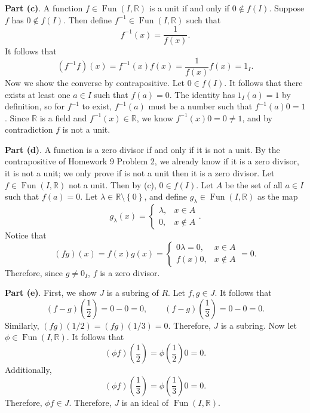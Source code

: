 \documentclass[11pt, letterpaper]{report}
\begin{document}
\noindent \textbf{Part (c)}. A function $f\in \operatorname{Fun}(I,\mathbb{R}) $ is a unit if and only if $0\notin f(I)$. Suppose $f$ has $0\notin f(I)$. Then define $f^{-1}\in \operatorname{Fun}(I,\mathbb{R}) $ such that
\[
	f^{-1}(x)=\frac{1}{f(x)}
.\]
It follows that
\[
	\left( f^{-1}f \right) (x)=f^{-1}(x)f(x)=\frac{1}{f(x)}f(x)=1_I
.\]
Now we show the converse by contrapositive. Let $0\in f(I)$. It follows that there exists at least one $a\in I$ such that $f(a)=0$. The identity  has $1_I(a)=1$ by definition, so for $f^{-1}$ to exist, $f^{-1}(a)$ must be a number such that $f^{-1}(a)0=1$. Since $\mathbb{R}$ is a field and $f^{-1}\left( x \right) \in\mathbb{R}$, we know $f^{-1}(x)0=0\neq 1$, and by contradiction $f$ is not a unit.

\noindent \textbf{Part (d)}. A function is a zero divisor if and only if it is not a unit. By the contrapositive of Homework 9 Problem 2, we already know if it is a zero divisor, it is not a unit; we only prove if is not a unit then it is a zero divisor. Let $f\in \operatorname{Fun}(I,\mathbb{R}) $ not a unit. Then by (c), $0\in f(I)$. Let $A$ be the set of all $a\in I$ such that $f(a)=0$. Let $\lambda \in\mathbb{R}\setminus\left\{ 0 \right\} $, and define $g_{\lambda }\in \operatorname{Fun}(I,\mathbb{R}) $ as the map
\[
	g_{\lambda }(x)=
	\begin{cases}
		\lambda ,&x\in A\\
		0,&x\notin A
	\end{cases}
.\]
Notice that
\[
	(fg)(x)=f(x)g(x)=
	\begin{cases}
		0\lambda=0 ,&x\in A\\
		f(x)0,&x\notin A
	\end{cases}=0
.\]
Therefore, since $g\neq 0_I$, $f$ is a zero divisor.

\noindent \textbf{Part (e)}. First, we show $J$ is a subring of $R$. Let $f,g\in J$. It follows that
\[
	(f-g)\left( \frac{1}{2} \right) =0-0=0,\qquad \left( f-g \right) \left( \frac{1}{3} \right) =0-0=0
.\]
Similarly, $(fg)(1 /2)=(fg)(1 /3)=0$. Therefore, $J$ is a subring. Now let $\phi \in \operatorname{Fun}(I,\mathbb{R}) $. It follows that
\[
	(\phi f)\left( \frac{1}{2} \right) =\phi \left( \frac{1}{2} \right) 0=0
.\]
Additionally,
\[
	\left( \phi f \right) \left( \frac{1}{3} \right) =\phi \left( \frac{1}{3} \right) 0=0
.\]
Therefore, $\phi f\in J $. Therefore, $J$ is an ideal of $\operatorname{Fun}(I,\mathbb{R}) $.
\end{document}
